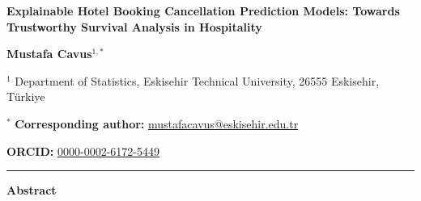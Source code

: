 \documentclass[12pt,a4paper]{article}
\begin{document}
\begin{center}
{\Large \textbf{Explainable Hotel Booking Cancellation Prediction Models: Towards Trustworthy Survival Analysis in Hospitality}}
\end{center}

\vspace{1em}

\begin{center}
\textbf{Mustafa Cavus}$^{1,*}$
\end{center}

\begin{center}
$^{1}$ Department of Statistics, Eskisehir Technical University, 26555 Eskisehir, T\"{u}rkiye
\end{center}

\begin{center}
$^{*}$ \textbf{Corresponding author:} \href{mailto:mustafacavus@eskisehir.edu.tr}{mustafacavus@eskisehir.edu.tr}
\end{center}

\begin{center}
\textbf{ORCID:} \href{https://orcid.org/0000-0002-6172-5449}{0000-0002-6172-5449}
\end{center}

\vspace{1em}
\hrule
\vspace{1em}

\noindent \textbf{Abstract}
\end{document}
